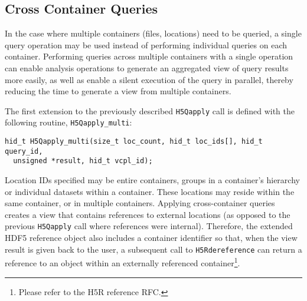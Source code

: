 \subsection{Cross Container Queries}

In the case where multiple containers (files, locations) need to be queried,
a single query operation may be used instead of performing individual queries
on each container. Performing queries across multiple containers with a single
operation can enable analysis operations to generate an aggregated
view of query results more easily, as well as enable a silent execution of the
query in parallel, thereby reducing the time to generate a view from multiple containers.

The first extension to the previously described \texttt{H5Qapply} call is defined
with the following routine, \texttt{H5Qapply\_multi}:

{
\begin{lstlisting}
hid_t H5Qapply_multi(size_t loc_count, hid_t loc_ids[], hid_t query_id,
  unsigned *result, hid_t vcpl_id);
\end{lstlisting}
}

Location IDs specified may be entire containers, groups in a container's hierarchy
or individual datasets within a container. These locations may reside within the
same container, or in multiple containers.
Applying cross-container queries creates a view that contains references
to external locations (as opposed to the previous \texttt{H5Qapply} call where
references were internal). Therefore, the extended HDF5 reference object
also includes a container identifier so that, when the view result is
given back to the user, a subsequent call to \texttt{H5Rdereference} can return
a reference to an object within an externally referenced container\footnote{
Please refer to the H5R reference RFC.}.


